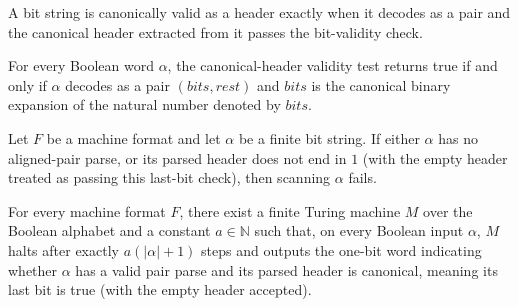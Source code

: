 \begin{definition}
\label{Turing.MachineFormat.canonHeaderOK}
\leanok
{}
A bit string is canonically valid as a header exactly when it decodes as a pair and the
canonical header extracted from it passes the bit-validity check.
\end{definition}

\begin{lemma}
\label{Turing.MachineFormat.canonHeaderOK_iff}
\leanok
{}
For every Boolean word $\alpha$, the canonical-header validity test returns true if and
only if $\alpha$ decodes as a pair $(bits,rest)$ and $bits$ is the canonical binary
expansion of the natural number denoted by $bits$.
\end{lemma}

\begin{lemma}
\label{Turing.MachineFormat.scan_eq_none_of_canonHeaderOK}
\leanok
{}
Let $F$ be a machine format and let $\alpha$ be a finite bit string. If either $\alpha$
has no aligned-pair parse, or its parsed header does not end in $1$ (with the empty
header treated as passing this last-bit check), then scanning $\alpha$ fails.
\end{lemma}

\begin{lemma}
\label{Turing.MachineFormat.exists_canonHeaderOKTM}
\leanok
{}
For every machine format $F$, there exist a finite Turing machine $M$ over the Boolean
alphabet and a constant $a\in\mathbb N$ such that, on every Boolean input $\alpha$,
$M$ halts after exactly $a(|\alpha|+1)$ steps and outputs the one-bit word indicating
whether $\alpha$ has a valid pair parse and its parsed header is canonical, meaning its
last bit is true (with the empty header accepted).
\end{lemma}

